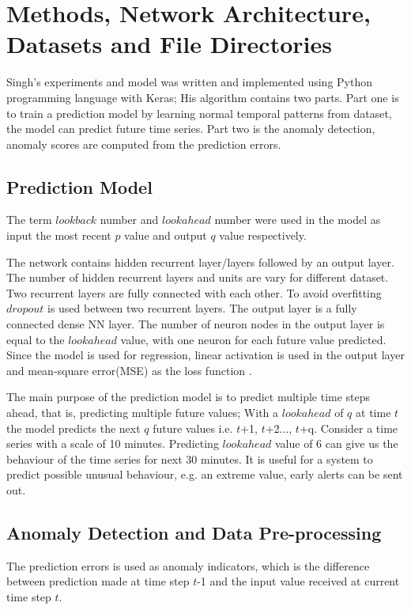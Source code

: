 \documentclass{article}
\begin{document}
\section{Methods, Network Architecture, Datasets and File Directories}

Singh's experiments and model was written and implemented using Python
programming language with Keras; His algorithm contains two parts. Part one is
to train a prediction model by learning normal temporal patterns from dataset,
the model can predict future time series. Part two is the anomaly detection,
anomaly scores are computed from the prediction errors.


\subsection{Prediction Model}
The term $lookback$ number and $lookahead$ number were used in 
the model as input the most recent $p$ value and output $q$ value respectively.

The network contains hidden recurrent layer/layers followed by an output
layer. The number of hidden recurrent layers and units are vary for different
dataset. Two recurrent layers are fully connected with each other. To avoid
overfitting $dropout$ is used between two recurrent layers. The output layer is
a fully connected dense NN layer. The number of neuron nodes in the output
layer is equal to the $lookahead$ value, with one neuron for each future value
predicted. Since the model is used for regression, linear activation is used in
the output layer and mean-square error(MSE) as the loss function
\cite{7-lstmthisis}.

The main purpose of the prediction model is to predict multiple time steps
ahead, that is, predicting multiple future values; With a $lookahead$ of $q$ at
time $t$ the model predicts the next $q$ future values i.e.
$t$+1, $t$+2..., $t$+q. Consider a time series with a scale of 10 minutes.
Predicting $lookahead$ value of 6 can give us the behaviour
of the time series for next 30 minutes. It is useful for a system to predict
possible unusual behaviour, e.g. an extreme value, early alerts can be sent
out. 

\subsection{Anomaly Detection and Data Pre-processing}
The prediction errors is used as anomaly indicators, which
is the difference between prediction made at time step $t$-1 and the input
value received at current time step $t$. 
\end{document}
